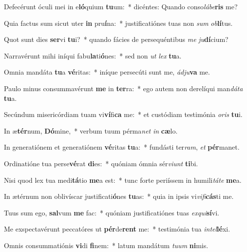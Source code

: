 \item Defecérunt óculi mei in e\textbf{ló}quium \textbf{tu}um:~* dicéntes: Quando conso\textit{lá}\textit{be}\textbf{ris} me?
\item Quia factus sum sicut uter \textbf{in} pru\textbf{í}na:~* justificatiónes tuas non \textit{sum} \textit{ob}\textbf{lí}tus.
\item Quot sunt dies \textbf{ser}vi \textbf{tu}i?~* quando fácies de persequéntibus \textit{me} \textit{ju}\textbf{dí}cium?
\item Narravérunt mihi iníqui fabu\textbf{la}ti\textbf{ó}nes:~* sed non \textit{ut} \textit{lex} \textbf{tu}a.
\item Omnia mandáta \textbf{tu}a \textbf{vé}ritas:~* iníque persecúti sunt me, \textit{ád}\textit{ju}\textbf{va} me.
\item Paulo minus consummavérunt \textbf{me} in \textbf{ter}ra:~* ego autem non derelíqui man\textit{dá}\textit{ta} \textbf{tu}a.
\item Secúndum misericórdiam tuam vi\textbf{ví}fi\textbf{ca} me:~* et custódiam testimónia \textit{o}\textit{ris} \textbf{tu}i.
\item In æ\textbf{tér}num, \textbf{Dó}mine,~* verbum tuum pérma\textit{net} \textit{in} \textbf{cæ}lo.
\item In generatiónem et generatiónem \textbf{vé}ritas \textbf{tu}a:~* fundásti ter\textit{ram}, \textit{et} \textbf{pér}manet.
\item Ordinatióne tua perse\textbf{vé}rat \textbf{di}es:~* quóniam ómnia sér\textit{vi}\textit{unt} \textbf{ti}bi.
\item Nisi quod lex tua medi\textbf{tá}tio \textbf{me}a est:~* tunc forte periíssem in humili\textit{tá}\textit{te} \textbf{me}a.
\item In ætérnum non oblivíscar justificati\textbf{ó}nes \textbf{tu}as:~* quia in ipsis vi\textit{vi}\textit{fi}\textbf{cás}ti me.
\item Tuus sum ego, \textbf{sal}vum \textbf{me} fac:~* quóniam justificatiónes tuas \textit{ex}\textit{qui}\textbf{sí}vi.
\item Me exspectavérunt peccatóres ut \textbf{pér}de\textbf{rent} me:~* testimónia tua \textit{in}\textit{tel}\textbf{lé}xi.
\item Omnis consummatiónis \textbf{vi}di \textbf{fi}nem:~* latum mandátum \textit{tu}\textit{um} \textbf{ni}mis.
